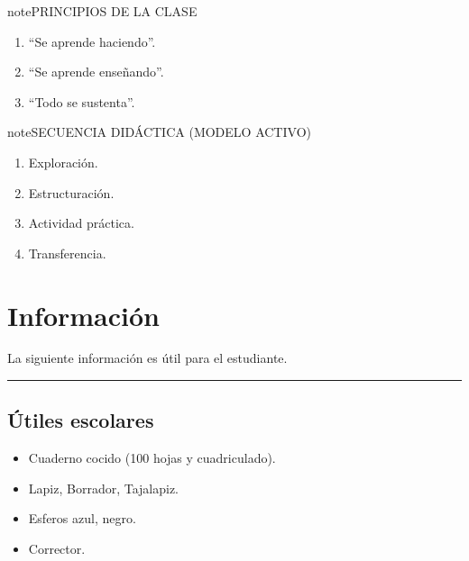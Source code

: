 \documentclass[letterpaper,10pt,spanish]{sphinxmanual}
\begin{document}
\begin{sphinxadmonition}{note}{PRINCIPIOS DE LA CLASE}
\begin{enumerate}
%
\item {} 
\sphinxAtStartPar
“Se aprende haciendo”.

\item {} 
\sphinxAtStartPar
“Se aprende enseñando”.

\item {} 
\sphinxAtStartPar
“Todo se sustenta”.

\end{enumerate}
\end{sphinxadmonition}

\begin{sphinxadmonition}{note}{SECUENCIA DIDÁCTICA (MODELO ACTIVO)}
\begin{enumerate}
%
\item {} 
\sphinxAtStartPar
Exploración.

\item {} 
\sphinxAtStartPar
Estructuración.

\item {} 
\sphinxAtStartPar
Actividad práctica.

\item {} 
\sphinxAtStartPar
Transferencia.

\end{enumerate}
\end{sphinxadmonition}

\sphinxstepscope


\chapter{Información}
\label{\detokenize{informacion:informacion}}\label{\detokenize{informacion::doc}}
\sphinxAtStartPar
La siguiente información es útil para el estudiante.


\bigskip\hrule\bigskip



\section{Útiles escolares}
\label{\detokenize{informacion:utiles-escolares}}\begin{itemize}
\item {} 
\sphinxAtStartPar
Cuaderno cocido (100 hojas y cuadriculado).

\item {} 
\sphinxAtStartPar
Lapiz, Borrador, Tajalapiz.

\item {} 
\sphinxAtStartPar
Esferos azul, negro.

\item {} 
\sphinxAtStartPar
Corrector.

\end{itemize}
\end{document}
